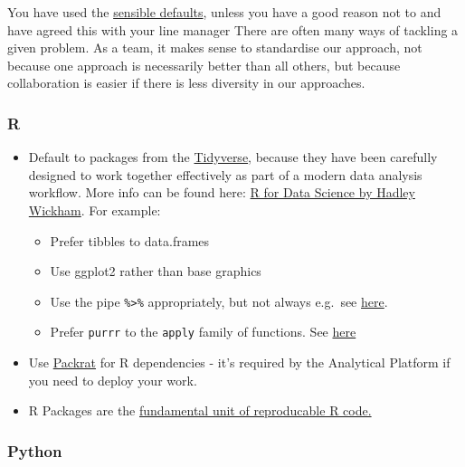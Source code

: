 \documentclass[]{book}
\providecommand{\tightlist}{%
  \setlength{\itemsep}{0pt}\setlength{\parskip}{0pt}}
\begin{document}
You have used the \href{https://github.com/moj-analytical-services/our-coding-standards/blob/master/sensible_defaults.md}{sensible defaults}, unless you have a good reason not to and have agreed this with your line manager
There are often many ways of tackling a given problem. As a team, it makes sense to standardise our approach, not because one approach is necessarily better than all others, but because collaboration is easier if there is less diversity in our approaches.

\hypertarget{r}{%
\subsubsection*{R}\label{r}}

\begin{itemize}
\tightlist
\item
  Default to packages from the \href{http://tidyverse.org/}{Tidyverse}, because they have been carefully designed to work together effectively as part of a modern data analysis workflow. More info can be found here: \href{http://r4ds.had.co.nz}{R for Data Science by Hadley Wickham}. For example:

  \begin{itemize}
  \tightlist
  \item
    Prefer tibbles to data.frames
  \item
    Use ggplot2 rather than base graphics
  \item
    Use the pipe \texttt{\%\textgreater{}\%} appropriately, but not always e.g.~see \href{https://twitter.com/hadleywickham/status/603883121197514752}{here}.\\
  \item
    Prefer \texttt{purrr} to the \texttt{apply} family of functions. See \href{http://r4ds.had.co.nz/iteration.html\#the-map-functions}{here}
  \end{itemize}
\item
  Use \href{https://rstudio.github.io/packrat/}{Packrat} for R dependencies - it's required by the Analytical Platform if you need to deploy your work.
\item
  R Packages are the \href{http://r-pkgs.had.co.nz/}{fundamental unit of reproducable R code.}
\end{itemize}

\hypertarget{python}{%
\subsubsection*{Python}\label{python}}
\end{document}

